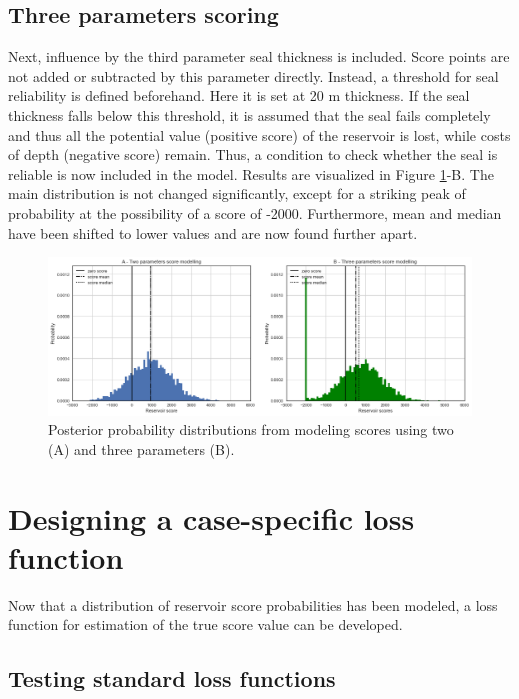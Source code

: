 	\subsection{Three parameters scoring}
	
	Next, influence by the third parameter seal thickness is included. Score points are not added or subtracted by this parameter directly. Instead, a threshold for seal reliability is defined beforehand. Here it is set at 20 m thickness. If the seal thickness falls below this threshold, it is assumed that the seal fails completely and thus all the potential value (positive score) of the reservoir is lost, while costs of depth (negative score) remain. Thus, a condition to check whether the seal is reliable is now included in the model. Results are visualized in Figure \ref{fig:score_results1}-B. The main distribution is not changed significantly, except for a striking peak of probability at the possibility of a score of -2000. Furthermore, mean and median have been shifted to lower values and are now found further apart.
	
	\begin{figure}[h]
		\centering
		\includegraphics[width=1\textwidth]{Figures/score_results1.png}
		\caption{Posterior probability distributions from modeling scores using two (A) and three parameters (B).}\label{fig:score_results1}
	\end{figure}
	
	\section{Designing a case-specific loss function}
	
	Now that a distribution of reservoir score probabilities has been modeled, a loss function for estimation of the true score value can be developed.
	
	\subsection{Testing standard loss functions}
	
